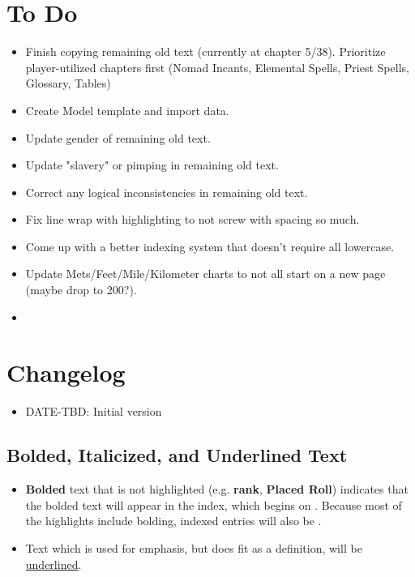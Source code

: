 \section{To Do}
\begin{itemize}
	\item Finish copying remaining old text (currently at chapter 5/38). Prioritize player-utilized chapters first (Nomad Incants, Elemental Spells, Priest Spells, Glossary, Tables)
	\item Create Model template and import data.
	\item Update gender of remaining old text.
	\item Update "slavery" or pimping in remaining old text.
	\item Correct any logical inconsistencies in remaining old text.
	\item Fix line wrap with highlighting to not screw with spacing so much.
	\item Come up with a better indexing system that doesn't require all lowercase.
	\item Update Mets/Feet/Mile/Kilometer charts to not all start on a new page (maybe drop to 200?).
	\item 
\end{itemize}
\section{Changelog}
\begin{itemize}[leftmargin=12pt]
\item DATE-TBD: Initial version
\end{itemize}
\subsection{Bolded, Italicized, and Underlined Text}
\begin{itemize}
\item \textbf{Bolded} text that is not highlighted (e.g. \textbf{rank}, \textbf{Placed Roll}) indicates that the bolded text will appear in the index, which begins on . Because most of the highlights include bolding, indexed entries will also be .
\item Text which is used for emphasis, but does fit as a definition, will be \ul{underlined}. 
\end{itemize}